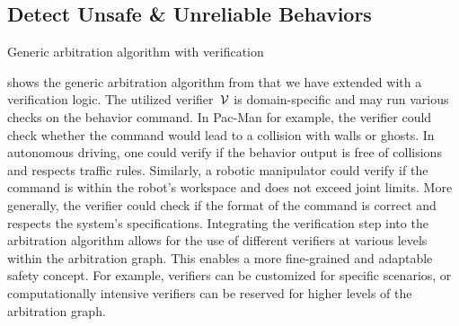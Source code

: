 \subsection{Detect Unsafe \& Unreliable Behaviors}
\begin{algorithm}

  \Fn{\BestOption{situation $\situation$}}{\label{algo:verifying_arbitrator:bestOption}
    filter applicable options $\applicableOptions \subset \options$\;
    sort applicable options
      $\sortedApplicableOptions = \left< a_0, a_1, \dots \right> = \text{strategie}(\applicableOptions)$\;

    \For{$a \in \sortedApplicableOptions$}{
      get command $\command_a = \getCommand_a(\situation)$\;

      verify $\verification_a = \verifier (\command_a)$\;
      \If{verification passed $\verification_a = 0$}{%
        \KwRet{$(\command_a, \verification_a)$}\;
      }
    }

    \KwRet{$(\emptyset, \text{NO\_SAFE\_OPTION})$}\;
    }
  \;
  \caption{Generic arbitration algorithm with verification \label{algo:verifying_arbitrator}}
\end{algorithm}

 shows the generic arbitration algorithm from \cite{lauerCognitiveConceptsAutonomous2010}
that we have extended with a verification logic.
The utilized verifier~$\mathcal{V}$ is domain-specific and may run various checks on the behavior command.
In Pac-Man for example, the verifier could check whether the command would lead to a collision with walls or ghosts.
In autonomous driving, one could verify if the behavior output is free of collisions and respects traffic rules.
Similarly, a robotic manipulator could verify if the command is within the robot's workspace and does not exceed joint limits.
More generally, the verifier could check if the format of the command is correct and respects the system's specifications.
Integrating the verification step into the arbitration algorithm allows for the use of different verifiers at various levels within the arbitration graph.
This enables a more fine-grained and adaptable safety concept.
For example, verifiers can be customized for specific scenarios, or computationally intensive verifiers can be reserved for higher levels of the arbitration graph.

